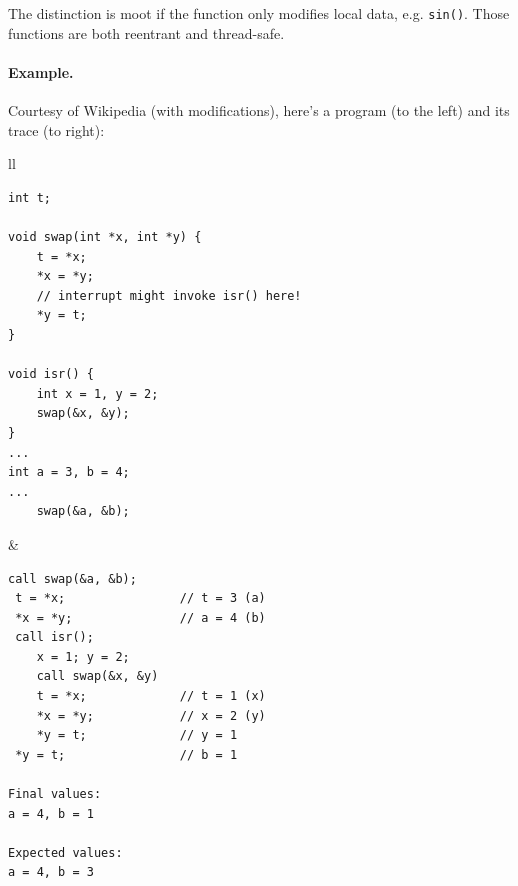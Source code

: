 \documentclass[11pt]{article}
\begin{document}
The distinction is moot if the function only modifies local data, e.g. {\tt sin()}.
Those functions are both reentrant and thread-safe.

\paragraph{Example.} Courtesy of Wikipedia (with modifications), here's a program (to the left) and its trace (to right):
\begin{center}
\begin{tabular}{ll}
\begin{minipage}{.5\textwidth}
  \begin{lstlisting}[basicstyle=\scriptsize]
int t;
 
void swap(int *x, int *y) {
    t = *x;
    *x = *y;
    // interrupt might invoke isr() here!
    *y = t;
}
 
void isr() {
    int x = 1, y = 2;
    swap(&x, &y);
}
...
int a = 3, b = 4;
...
    swap(&a, &b);
  \end{lstlisting}
\end{minipage}
&
\begin{minipage}{.4\textwidth}
  \begin{lstlisting}[basicstyle=\scriptsize]
call swap(&a, &b);
 t = *x;                // t = 3 (a)
 *x = *y;               // a = 4 (b)
 call isr();
    x = 1; y = 2;
    call swap(&x, &y)
    t = *x;             // t = 1 (x)
    *x = *y;            // x = 2 (y)
    *y = t;             // y = 1
 *y = t;                // b = 1

Final values:
a = 4, b = 1

Expected values:
a = 4, b = 3
  \end{lstlisting}
\end{minipage}
\end{tabular}
\end{center}
\end{document}
